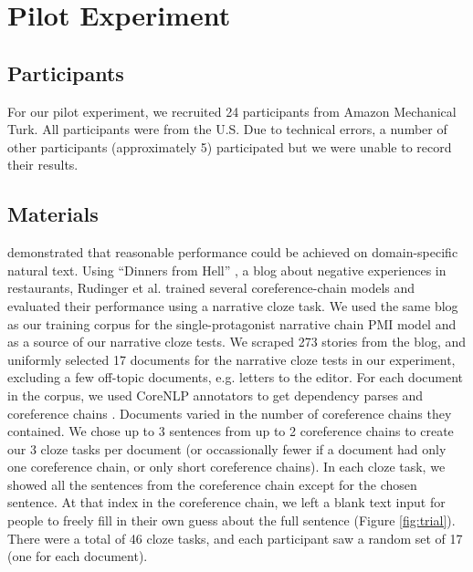 \documentclass[10pt,a4paper]{article}
\newcommand{\todo}[1]{{\color{red}#1}}
\begin{document}

\section{Pilot Experiment}


\subsection{Participants}

For our pilot experiment, we recruited
24 participants from Amazon Mechanical Turk.
All participants were from the U.S.
Due to technical errors, a number of other participants (approximately 5) participated but we were unable to record their results.

\subsection{Materials}

 demonstrated that reasonable performance could be achieved on domain-specific natural text.
Using ``Dinners from Hell'' \cite{dinnersfromhell}, a blog about negative experiences in restaurants, Rudinger et al. trained several coreference-chain models and evaluated their performance using a narrative cloze task.
We used the same blog as our training corpus for the single-protagonist narrative chain PMI model and as a source of our narrative cloze tests.
We scraped 273 stories from the blog, and uniformly selected 17 documents for the narrative cloze tests in our experiment, excluding a few off-topic documents, e.g. letters to the editor.
For each document in the corpus, we used CoreNLP annotators \cite{corenlp} to get dependency parses \cite{depparse} and coreference chains \cite{coref2013a, coref2013b, coref2011, coref2010}.
Documents varied in the number of coreference chains they contained. We chose up to 3 sentences from up to 2 coreference chains to create our 3 cloze tasks per document (or occassionally fewer if a document had only one coreference chain, or only short coreference chains). In each cloze task, we showed all the sentences from the coreference chain except for the chosen sentence. At that index in the coreference chain, we left a blank text input for people to freely fill in their own guess about the full sentence (Figure \ref{fig:trial}). There were a total of 46 cloze tasks, and each participant saw a random set of 17 (one for each document).
\end{document}
